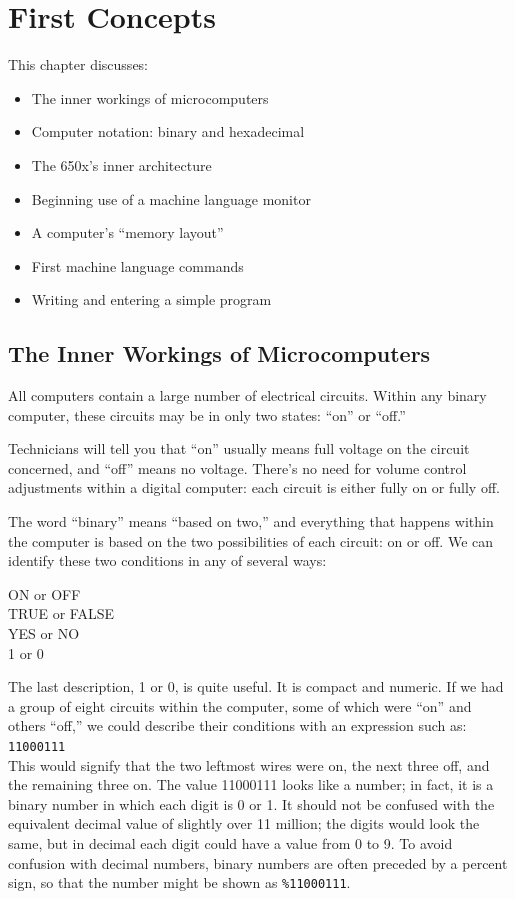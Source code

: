 \documentclass[11pt,a4paper,titlepage]{memoir}
\begin{document}
\chapter{First Concepts}
This chapter discusses:
\begin{itemize}
	\item The inner workings of microcomputers
	\item Computer notation: binary and hexadecimal
	\item The 650x's inner architecture
	\item Beginning use of a machine language monitor
	\item A computer's ``memory layout''
	\item First machine language commands
	\item Writing and entering a simple program
\end{itemize}
\newpage
\section{The Inner Workings of Microcomputers}
All computers contain a large number of electrical circuits. Within any binary computer, these circuits may be in only two states: ``on'' or ``off.''

Technicians will tell you that ``on'' usually means full voltage on the circuit concerned, and ``off'' means no voltage. There's no need for volume control adjustments within a digital computer: each circuit is either fully on or fully off.

The word ``binary'' means ``based on two,'' and everything that happens within the computer is based on the two possibilities of each circuit: on or off. We can identify these two conditions in any of several ways:
\begin{center}
ON or OFF\\
TRUE or FALSE\\
YES or NO\\
1 or 0
\end{center}
The last description, 1 or 0, is quite useful. It is compact and numeric. If we had a group of eight circuits within the computer, some of which were ``on'' and others ``off,'' we could describe their conditions with an expression such as:\\

\texttt{11000111}\\

This would signify that the two leftmost wires were on, the next three off, and the remaining three on. The value 11000111 looks like a number; in fact, it is a binary number in which each digit is 0 or 1. It should not be confused with the equivalent decimal value of slightly over 11 million; the digits would look the same, but in decimal each digit could have a value from 0 to 9. To avoid confusion with decimal numbers, binary numbers are often preceded by a percent sign, so that the number might be shown as \texttt{\%11000111}.
\end{document}
